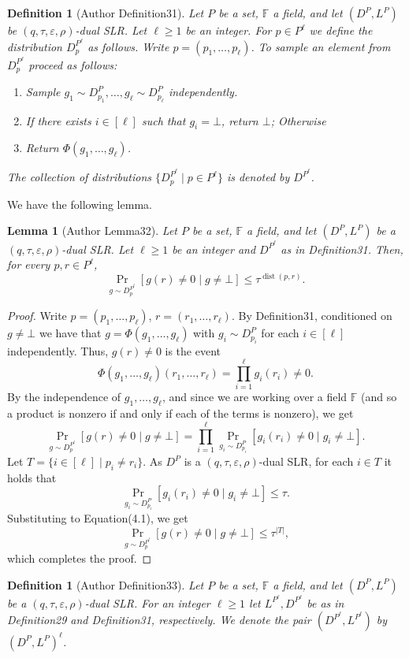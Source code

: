 \documentclass[10pt,a4paper]{article}
\newtheorem{ntdefinition}[nttheorem]{Definition}
\newtheorem{ntlemma}[nttheorem]{Lemma}
\begin{document}
\begin{ntdefinition}[Author Definition31]
Let $P$ be a set, $\mathbb F$ a field, and let $(D^P,L^P)$ be $(q,\tau,\varepsilon,\rho)$-dual SLR. Let $\ell\geq1$ be an integer. For $p\in P^\ell$ we define the distribution $D_p^{P^\ell}$ as follows. Write $p=(p_1,\ldots,p_\ell)$. To sample an element from $D_p^{P^\ell}$ proceed as follows:
\begin{enumerate}
\item Sample $g_1\sim D_{p_1}^P,\ldots,g_\ell\sim D_{p_\ell}^P$ independently.
\item If there exists $i\in[\ell]$ such that $g_i=\bot$, return $\bot$; Otherwise
\item Return $\Phi(g_1,\ldots,g_\ell)$.
\end{enumerate}
The collection of distributions $\{D_p^{P^\ell}\mid p\in P^\ell\}$ is denoted by $D^{P^\ell}$.
\end{ntdefinition}
We have the following lemma.
\begin{ntlemma}[Author Lemma32]
Let $P$ be a set, $\mathbb F$ a field, and let $(D^P,L^P)$ be a $(q,\tau,\varepsilon,\rho)$-dual SLR. Let $\ell\geq1$ be an integer and $D^{P^\ell}$ as in Definition31. Then, for every $p,r\in P^\ell$,
\[\Pr_{g\sim D_p^{P^\ell}}[g(r)\ne0\mid g\ne\bot]\leq\tau^{\operatorname{dist}(p,r)}.\]
\end{ntlemma}
\begin{proof}
Write $p=(p_1,\ldots,p_\ell)$, $r=(r_1,\ldots,r_\ell)$. By Definition31, conditioned on $g\ne\bot$ we have that $g=\Phi(g_1,\ldots,g_\ell)$ with $g_i\sim D_{p_i}^P$ for each $i\in[\ell]$ independently. Thus, $g(r)\ne0$ is the event
\[\Phi(g_1,\ldots,g_\ell)(r_1,\ldots,r_\ell)=\prod_{i=1}^\ell g_i(r_i)\ne0.\]
By the independence of $g_1,\ldots,g_\ell$, and since we are working over a field $\mathbb F$ (and so a product is nonzero if and only if each of the terms is nonzero), we get
\begin{equation}\Pr_{g\sim D_p^{P^\ell}}[g(r)\ne0\mid g\ne\bot]=\prod_{i=1}^\ell\Pr_{g_i\sim D_{p_i}^P}[g_i(r_i)\ne0\mid g_i\ne\bot].\tag{4.1}\end{equation}
Let $T=\{i\in[\ell]\mid p_i\ne r_i\}$. As $D^P$ is a $(q,\tau,\varepsilon,\rho)$-dual SLR, for each $i\in T$ it holds that
\[\Pr_{g_i\sim D_{p_i}^P}[g_i(r_i)\ne0\mid g_i\ne\bot]\leq\tau.\]
Substituting to Equation(4.1), we get
\[\Pr_{g\sim D_p^{P^\ell}}[g(r)\ne0\mid g\ne\bot]\leq\tau^{|T|},\]
which completes the proof.
\end{proof}
\begin{ntdefinition}[Author Definition33]
Let $P$ be a set, $\mathbb F$ a field, and let $(D^P,L^P)$ be a $(q,\tau,\varepsilon,\rho)$-dual SLR. For an integer $\ell\geq1$ let $L^{P^\ell},D^{P^\ell}$ be as in Definition29 and Definition31, respectively. We denote the pair $(D^{P^\ell},L^{P^\ell})$ by $(D^P,L^P)^\ell$.
\end{ntdefinition}
\end{document}
